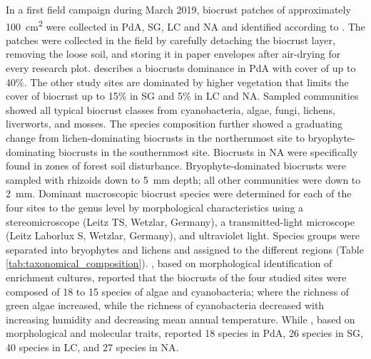 In a first field campaign during March 2019, biocrust patches of approximately \SI{100}{\centi\metre^{2}} were collected in PdA, SG, LC and NA and identified according to \citet{Lange2016}. The patches were collected in the field by carefully detaching the biocrust layer, removing the loose soil, and storing it in paper envelopes after air-drying for every research plot. \citet{Samolov2020} describes a biocrusts dominance in PdA with cover of up to 40\%. The other study sites are dominated by higher vegetation that limits the cover of biocrust up to 15\% in SG and 5\% in LC and NA. Sampled communities showed all typical biocrust classes from cyanobacteria, algae, fungi, lichens, liverworts, and mosses. The species composition further showed a graduating change from lichen-dominating biocrusts in the northernmost site to bryophyte-dominating biocrusts in the southernmost site. Biocrusts in NA were specifically found in zones of forest soil disturbance. Bryophyte-dominated biocrusts were sampled with rhizoids down to \SI{5}{\milli\metre} depth; all other communities were down to \SI{2}{\milli\metre}. Dominant macroscopic biocrust species were determined for each of the four sites to the genus level by morphological characteristics using a stereomicroscope (Leitz TS, Wetzlar, Germany), a transmitted-light microscope (Leitz Laborlux S, Wetzlar, Germany), and ultraviolet light. Species groups were separated into bryophytes \citep{Ardiles2014,BednarekOchyra2001,Cuvertino2012,He1998,Lightowlers2013} and lichens \citep{Galloway2007} and assigned to the different regions (Table \ref{tab:taxonomical_composition}). \citet{Bernhard2018}, based on morphological identification of enrichment cultures, reported that the biocrusts of the four studied sites were composed of 18 to 15 species of algae and cyanobacteria; where the richness of green algae increased, while the richness of cyanobacteria decreased with increasing humidity and decreasing mean annual temperature. While \citet{Samolov2020}, based on morphological and molecular traits, reported 18 species in PdA, 26 species in SG, 40 species in LC, and 27 species in NA.

